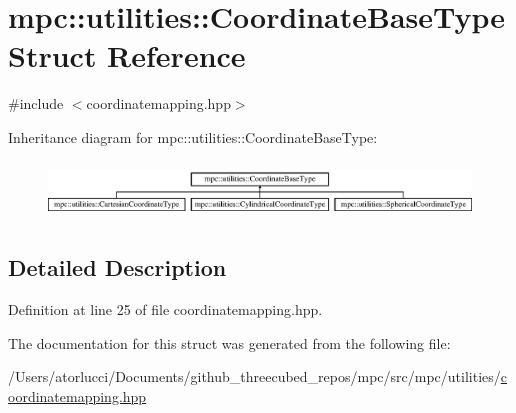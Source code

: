 \hypertarget{structmpc_1_1utilities_1_1_coordinate_base_type}{}\section{mpc\+:\+:utilities\+:\+:Coordinate\+Base\+Type Struct Reference}
\label{structmpc_1_1utilities_1_1_coordinate_base_type}


{\ttfamily \#include $<$coordinatemapping.\+hpp$>$}

Inheritance diagram for mpc\+:\+:utilities\+:\+:Coordinate\+Base\+Type\+:\begin{figure}[H]
\begin{center}
\leavevmode
\includegraphics[height=1.530055cm]{structmpc_1_1utilities_1_1_coordinate_base_type}
\end{center}
\end{figure}


\subsection{Detailed Description}


Definition at line 25 of file coordinatemapping.\+hpp.



The documentation for this struct was generated from the following file\+:\begin{DoxyCompactItemize}
\item 
/\+Users/atorlucci/\+Documents/github\+\_\+threecubed\+\_\+repos/mpc/src/mpc/utilities/\mbox{\hyperlink{coordinatemapping_8hpp}{coordinatemapping.\+hpp}}\end{DoxyCompactItemize}
